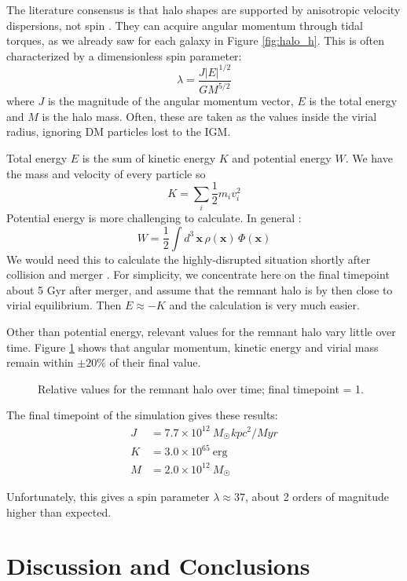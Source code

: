 \documentclass[twocolumn]{aastex63}
\newcommand{\todo}{\color{red}{TODO}\color{black}\hspace{2mm}}
\begin{document}
The literature consensus is that halo shapes are supported by anisotropic velocity dispersions, not spin \citep{frenk_dark_2012}. They can acquire angular momentum through tidal torques, as we already saw for each galaxy in Figure \ref{fig:halo_h}. This is often characterized by a dimensionless spin parameter:
\[ \lambda = \frac{J |E|^{1/2}}{G M^{5/2}} \]
where $J$ is the magnitude of the angular momentum vector, $E$ is the total energy and $M$ is the halo mass. Often, these are taken as the values inside the virial radius, ignoring DM particles lost to the IGM.

Total energy $E$ is the sum of kinetic energy $K$ and potential energy $W$. We have the mass and velocity of every particle so 
\[ K = \sum_i \frac{1}{2} m_i v_i^2 \]
Potential energy is more challenging to calculate. In general \citep[section 2.1]{binney_galactic_2008}:
\[ W = \frac{1}{2} \int d^3\, \mathbf{x}\, \rho(\mathbf{x})\, \Phi(\mathbf{x}) \]
We would need this to calculate the highly-disrupted situation shortly after collision and merger \citep[section 8.2]{binney_galactic_2008}. For simplicity, we concentrate here on the final timepoint about 5 Gyr after merger, and assume that the remnant halo is by then close to virial equilibrium. Then $E \approx -K$ and the calculation is very much easier.

Other than potential energy, relevant values for the remnant halo vary little over time. Figure \ref{fig:rem_data} shows that angular momentum, kinetic energy and virial mass remain within $\pm 20\%$ of their final value.

\begin{figure}[htb!]
	\caption{Relative values for the remnant halo over time; final timepoint = 1.
		\label{fig:rem_data}}
\end{figure}

The final timepoint of the simulation gives these results:
\begin{align*}
	J &= 7.7 \times 10^{12}\ M_\Sun kpc^2 / Myr\\
	K &= 3.0 \times 10^{65}\ \text{erg}\\
	M &= 2.0 \times 10^{12}\ M_\Sun
\end{align*}

Unfortunately, this gives a spin parameter $\lambda \approx 37$, about 2 orders of magnitude higher than expected.

\todo{\textbf{Figure out what went wrong!}}

\section{Discussion and Conclusions}
\end{document}
